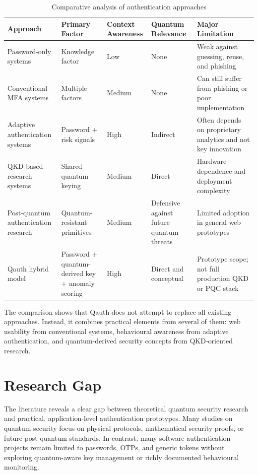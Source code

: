 \begin{table}[H]
\centering
\small
\caption{Comparative analysis of authentication approaches}
\label{tab:literature-comparison}
\begin{tabular}{|p{3.1cm}|p{2.2cm}|p{2.4cm}|p{2.5cm}|p{3.3cm}|}
\hline
\textbf{Approach} & \textbf{Primary Factor} & \textbf{Context Awareness} & \textbf{Quantum Relevance} & \textbf{Major Limitation} \\
\hline
Password-only systems & Knowledge factor & Low & None & Weak against guessing, reuse, and phishing \\
\hline
Conventional MFA systems & Multiple factors & Medium & None & Can still suffer from phishing or poor implementation \\
\hline
Adaptive authentication systems & Password + risk signals & High & Indirect & Often depends on proprietary analytics and not key innovation \\
\hline
QKD-based research systems & Shared quantum keying & Medium & Direct & Hardware dependence and deployment complexity \\
\hline
Post-quantum authentication research & Quantum-resistant primitives & Medium & Defensive against future quantum threats & Limited adoption in general web prototypes \\
\hline
Qauth hybrid model & Password + quantum-derived key + anomaly scoring & High & Direct and conceptual & Prototype scope; not full production QKD or PQC stack \\
\hline
\end{tabular}
\end{table}

The comparison shows that Qauth does not attempt to replace all existing approaches. Instead, it combines practical elements from several of them: web usability from conventional systems, behavioural awareness from adaptive authentication, and quantum-derived security concepts from QKD-oriented research.

\section{Research Gap}
The literature reveals a clear gap between theoretical quantum security research and practical, application-level authentication prototypes. Many studies on quantum security focus on physical protocols, mathematical security proofs, or future post-quantum standards. In contrast, many software authentication projects remain limited to passwords, OTPs, and generic tokens without exploring quantum-aware key management or richly documented behavioural monitoring.

